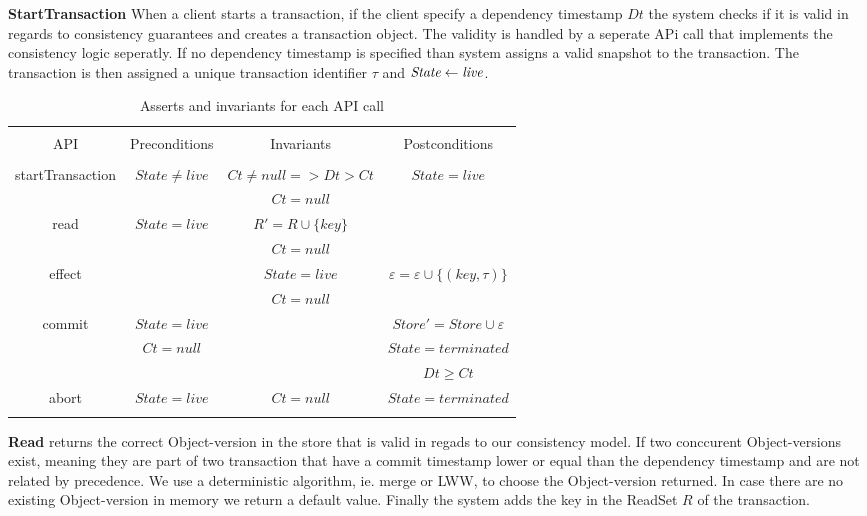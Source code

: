 \documentclass[systeme,french,english]{compas2022}
\begin{document}
\textbf{StartTransaction} When a client starts a transaction, if the client specify a dependency timestamp $Dt$ the system checks if it is valid in regards to consistency guarantees and creates a transaction object.
The validity is handled by a seperate APi call that implements the consistency logic seperatly.
If no dependency timestamp is specified than system assigns a valid snapshot to the transaction.
The transaction is then assigned a unique transaction identifier $\tau$ and $\emph{State} \leftarrow \emph{live}$.


\begin{table}
  \centering
  \begin{tabular}{|c|c|c|c|}
    \hline
    & & & \\
    API & Preconditions & Invariants & Postconditions\\
    & & & \\
    \hline
    startTransaction & $\mathit{State \neq live}$ & $\mathit{Ct \neq null => Dt > Ct}$ & $\mathit{State = live}$\\
    & & $\mathit{Ct = null}$ & \\
    \hline
    read & $\mathit{State = live}$ & $\mathit{R' = R \cup \{key\}}$ &\\
    & & $\mathit{Ct = null}$ & \\
    \hline
    effect & & $\mathit{State = live}$ & $\mathit{\varepsilon = \varepsilon \cup \{(key, \tau)\}}$ \\
    & & $\mathit{Ct = null}$ & \\
    \hline
    commit & $\mathit{State = live}$ &  & $\mathit{Store' = Store \cup \varepsilon}$\\
    & $\mathit{Ct = null}$ & & $\mathit{State = terminated}$ \\
    & & & $\mathit{Dt \geq Ct}$ \\
    \hline
    abort & $\mathit{State = live}$ & $\mathit{Ct = null}$ & $\mathit{State = terminated}$\\
    & & & \\
    \hline

  \end{tabular}
  \caption{Asserts and invariants for each API call}
  \label{tab:AssertInvariantsUnbounded}
\end{table}

\textbf{Read} returns the correct Object-version in the store that is valid in regads to our consistency model.
If two conccurent Object-versions exist, meaning they are part of two transaction that have a commit timestamp lower or equal than the dependency timestamp and are not related by precedence.
We use a deterministic algorithm, ie. merge or LWW, to choose the Object-version returned.
In case there are no existing Object-version in memory we return a default value.
Finally the system adds the key in the ReadSet $R$ of the transaction. 
\end{document}
